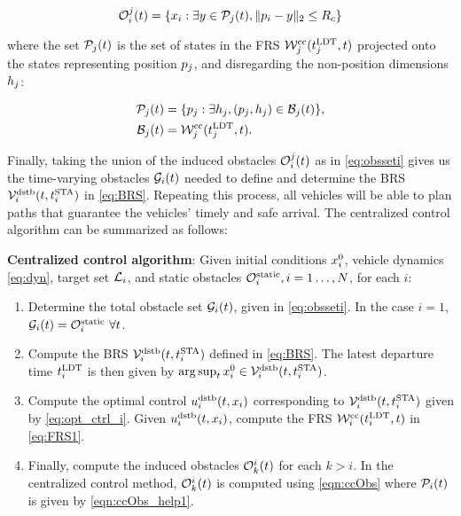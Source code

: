 \begin{equation} \label{eqn:ccObs}
\ioset_i^j(t) = \{\state_i: \exists y \in \pfrs_j(t), \|\pos_i - y\|_2 \le \rc \}
\end{equation}

\noindent where the set $\mathcal{P}_j(t)$ is the set of states in the FRS $\mathcal{W}_j^\text{cc}(t^\text{LDT}_j, t)$ projected onto the states representing position $p_j$, and disregarding the non-position dimensions $h_j$:

\begin{align} 
\pfrs_j(t) & = \{p_j: \exists \npos_j, (p_j, \npos_j) \in \boset_j(t) \}, \label{eqn:ccObs_help1}\\
\boset_j(t) & = \frs_j^\text{cc}(\ldt_j, t). \label{eqn:ccObs_help2}
\end{align}

Finally, taking the union of the induced obstacles $\mathcal{O}_i^j(t)$ as in \eqref{eq:obsseti} gives us the time-varying obstacles $\mathcal{G}_i(t)$ needed to define and determine the BRS $\mathcal{V}_i^\text{dstb}(t, t^\text{STA}_i)$ in \eqref{eq:BRS}. Repeating this process, all vehicles will be able to plan paths that guarantee the vehicles' timely and safe arrival. The centralized control algorithm can be summarized as follows:
\begin{alg}
\label{alg:cc}
\textbf{Centralized control algorithm}: Given initial conditions $x_i^0$, vehicle dynamics \eqref{eq:dyn}, target set $\mathcal{L}_i$, and static obstacles $\mathcal{O}^\text{static}_i, i = 1\ldots, N$, for each $i$:
\begin{enumerate}
\item Determine the total obstacle set $\mathcal{G}_i(t)$, given in \eqref{eq:obsseti}. In the case $i=1$, $\mathcal{G}_i(t) = \mathcal{O}^\text{static}_i ~ \forall t$.
\item Compute the BRS $\mathcal{V}_i^\text{dstb}(t, t^\text{STA}_i)$ defined in \eqref{eq:BRS}. The latest departure time $t^\text{LDT}_i$ is then given by $\arg \sup_t x^0_i \in \mathcal{V}_i^\text{dstb}(t, t^\text{STA}_i)$.
\item Compute the optimal control $u_i^\text{dstb}(t,x_i)$ corresponding to $\mathcal{V}_i^\text{dstb}(t, t^\text{STA}_i)$ given by \eqref{eq:opt_ctrl_i}. Given $u_i^\text{dstb}(t,x_i)$, compute the FRS $\mathcal{W}_i^\text{cc}(t^\text{LDT}_i, t)$ in \eqref{eq:FRS1}.
\item Finally, compute the induced obstacles $\mathcal{O}_k^i(t)$ for each $k>i$. In the centralized control method, $\mathcal{O}_k^i(t)$ is computed using \eqref{eqn:ccObs} where $\mathcal{P}_i(t)$ is given by \eqref{eqn:ccObs_help1}.
\end{enumerate}
\end{alg}